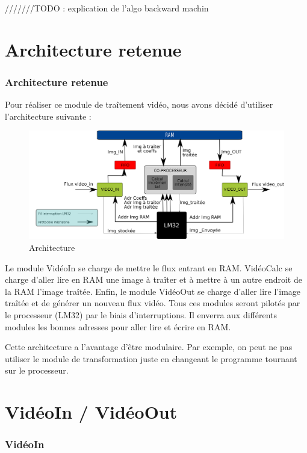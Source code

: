 \documentclass[a4paper,12pt]{report}
\begin{document}
{///////TODO : explication de l'algo backward machin}

	\part*{Architecture retenue}
	\section{Architecture retenue}
{Pour réaliser ce module de traîtement vidéo, nous avons décidé d'utiliser l'architecture suivante :
 
\begin{figure}[!h]
	\centering
	\includegraphics[scale = 0.1]{hardware-arch.png}
	\caption{Architecture}
\end{figure}

Le module VidéoIn se charge de mettre le flux entrant en RAM. VidéoCalc se charge d'aller lire en RAM une image à traîter et à mettre à un autre endroit de la RAM l'image traîtée. Enfin, le module VidéoOut se charge d'aller lire l'image traîtée et de générer un nouveau flux vidéo. Tous ces modules seront pilotés par le processeur (LM32) par le biais d'interruptions. Il enverra aux différents modules les bonnes adresses pour aller lire et écrire en RAM.


Cette architecture a l'avantage d'être modulaire. Par exemple, on peut ne pas utiliser le module de transformation juste en changeant le programme tournant sur le processeur.
}






    \part{VidéoIn / VidéoOut}

    \section{VidéoIn}
\end{document}
